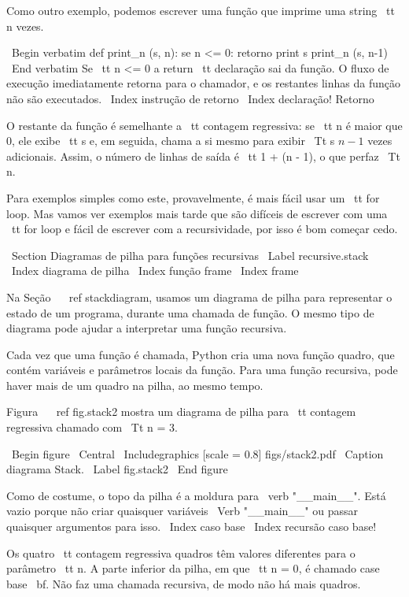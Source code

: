 \documentclass[10pt]{book}
\begin{document}
{{Como outro exemplo, podemos escrever uma função que imprime uma
string {\ tt n} vezes.

\ Begin {verbatim}
def print_n (s, n):
    se n <= 0:
        retorno
    print s
    print_n (s, n-1)
\ End {verbatim}
%
Se {\ tt n <= 0} a {return \ tt} declaração sai da função. O
fluxo de execução imediatamente retorna para o chamador, e os restantes
linhas da função não são executados.
\ Index {instrução de retorno}
\ Index {declaração! Retorno}

O restante da função é semelhante a {\ tt contagem regressiva}: se {\ tt n} é
maior que 0, ele exibe {\ tt s} e, em seguida, chama a si mesmo para exibir
{\ Tt s} $ n-1 $ vezes adicionais. Assim, o número de linhas de saída
é {\ tt 1 + (n - 1)}, o que perfaz
{\ Tt n}.

Para exemplos simples como este, provavelmente, é mais fácil usar um {\ tt
for} loop. Mas vamos ver exemplos mais tarde que são difíceis de escrever
com uma {\ tt for} loop e fácil de escrever com a recursividade, por isso é
bom começar cedo.



\ Section {Diagramas de pilha para funções recursivas}
\ Label {} recursive.stack
\ Index {diagrama de pilha}
\ Index {função frame}
\ Index {frame}

Na Seção ~ \ ref {} stackdiagram, usamos um diagrama de pilha para representar
o estado de um programa, durante uma chamada de função. O mesmo tipo de
diagrama pode ajudar a interpretar uma função recursiva.

Cada vez que uma função é chamada, Python cria uma nova função
quadro, que contém variáveis ​​e parâmetros locais da função.
Para uma função recursiva, pode haver mais de um quadro na
pilha, ao mesmo tempo.

Figura ~ \ ref {} fig.stack2 mostra um diagrama de pilha para {\ tt contagem regressiva} chamado com
{\ Tt n = 3}.

\ Begin {figure}
\ Central
{\ Includegraphics [scale = 0.8] {figs/stack2.pdf}}
\ Caption {diagrama Stack.}
\ Label {} fig.stack2
\ End {figure}


Como de costume, o topo da pilha é a moldura para \ verb "__main__".
Está vazio porque não criar quaisquer variáveis 
\ Verb "__main__" ou passar quaisquer argumentos para isso.
\ Index {caso base}
\ Index {recursão caso base!}

Os quatro {\ tt contagem regressiva} quadros têm valores diferentes para o
parâmetro {\ tt n}. A parte inferior da pilha, em que {\ tt n = 0}, é
chamado {case base \ bf}. Não faz uma chamada recursiva, de modo
não há mais quadros.

}}
\end{document}
